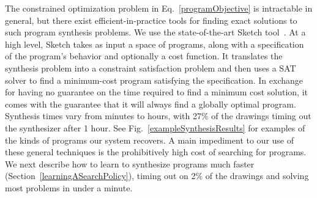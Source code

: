 \documentclass{article}
\begin{document}
The constrained optimization problem in
Eq.~\ref{programObjective} is intractable in general, but there
exist efficient-in-practice tools for finding exact solutions to such
program synthesis problems. We use the state-of-the-art Sketch
tool~\cite{solar2008program}.
At a
high level, Sketch takes as input a space of programs, along with a
specification of the program's behavior and optionally a cost
function.  It translates the synthesis problem into a constraint
satisfaction problem and then uses a SAT solver to find a
minimum-cost program satisfying the specification.  In exchange for
having no guarantee on the time required to find a minimum
cost solution, it comes with the guarantee that it will always find a
globally optimal program.
Synthesis times vary from minutes to hours,
with 27\% of the drawings timing out the synthesizer after 1 hour.
See Fig.~\ref{exampleSynthesisResults} for examples of the kinds of programs our system recovers.
A main impediment to our use of these general techniques is
the prohibitively high cost of searching for programs.
We next describe how to learn to synthesize programs much faster (Section~\ref{learningASearchPolicy}),
timing out on 2\% of the drawings and solving most problems in under a minute.

\newcommand{\exampleProgramSize}{4cm}
\newcommand{\exampleTraceSize}{3.5cm}
\newcommand{\exampleDrawingSize}{1.25cm}
\lstset{basicstyle = \scriptsize\ttfamily}
\end{document}
